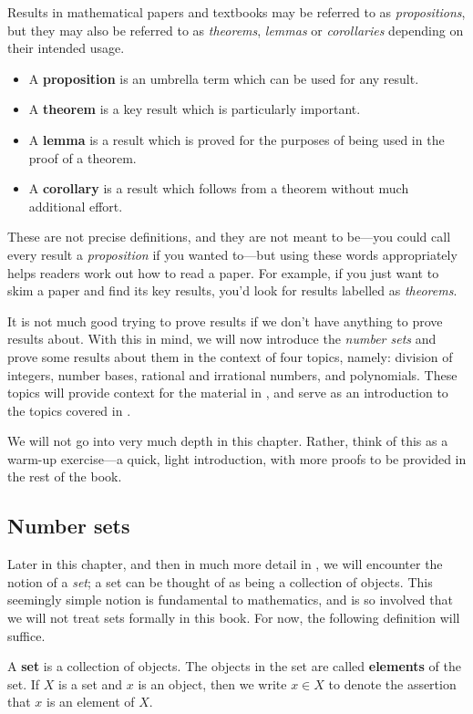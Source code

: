 Results in mathematical papers and textbooks may be referred to as \textit{propositions}, but they may also be referred to as \textit{theorems}, \textit{lemmas} or \textit{corollaries} depending on their intended usage.
\begin{itemize} 
\item A \textbf{proposition} is an umbrella term which can be used for any result.
\item A \textbf{theorem} is a key result which is particularly important.
\item A \textbf{lemma} is a result which is proved for the purposes of being used in the proof of a theorem. 
\item A \textbf{corollary} is a result which follows from a theorem without much additional effort.
\end{itemize}
These are not precise definitions, and they are not meant to be---you could call every result a \textit{proposition} if you wanted to---but using these words appropriately helps readers work out how to read a paper. For example, if you just want to skim a paper and find its key results, you'd look for results labelled as \textit{theorems}.

It is not much good trying to prove results if we don't have anything to prove results about. With this in mind, we will now introduce the \textit{number sets} and prove some results about them in the context of four topics, namely: division of integers, number bases, rational and irrational numbers, and polynomials. These topics will provide context for the material in , and serve as an introduction to the topics covered in .

We will not go into very much depth in this chapter. Rather, think of this as a warm-up exercise---a quick, light introduction, with more proofs to be provided in the rest of the book.

\subsection*{Number sets}

Later in this chapter, and then in much more detail in , we will encounter the notion of a \textit{set}; a set can be thought of as being a collection of objects. This seemingly simple notion is fundamental to mathematics, and is so involved that we will not treat sets formally in this book. For now, the following definition will suffice.

\begin{definition}
\label{defSetsPreliminary}
A \textbf{set} is a collection of objects. The objects in the set are called \textbf{elements} of the set. If $X$ is a set and $x$ is an object, then we write $x \in X$  to denote the assertion that $x$ is an element of $X$.
\end{definition}

